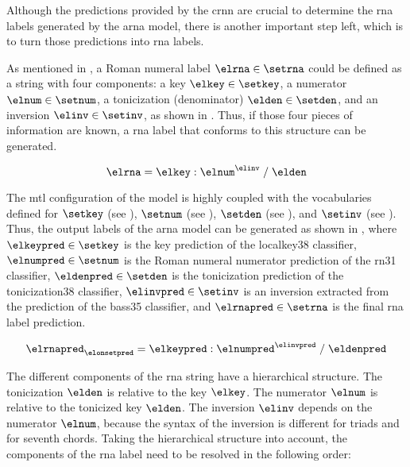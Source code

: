 
Although the predictions provided by the \gls{crnn} are
crucial to determine the \gls{rna} labels generated by the
\gls{arna} model, there is another important step left,
which is to turn those predictions into \gls{rna} labels.

As mentioned in
, a Roman
numeral label $\elrna \in \setrna$ could be defined as a
string with four components: a key $\elkey \in \setkey$, a
numerator $\elnum \in \setnum$, a tonicization (denominator)
$\elden \in \setden$, and an inversion $\elinv \in \setinv$,
as shown in . Thus, if those four pieces of
information are known, a \gls{rna} label that conforms to
this structure can be generated.

\begin{equation}
    \label{eq:rna}
    \elrna = \elkey : \elnum^{\elinv} \; / \; \elden
\end{equation}


The \gls{mtl} configuration of the model is highly coupled
with the vocabularies defined for $\setkey$ (see
), $\setnum$ (see
), $\setden$
(see ), and
$\setinv$ (see
). Thus, the
output labels of the \gls{arna} model can be generated as
shown in , where $\elkeypred \in \setkey$ is
the key prediction of the \gls{localkey38} classifier,
$\elnumpred \in \setnum$ is the Roman numeral numerator
prediction of the \gls{rn31} classifier, $\eldenpred \in
\setden$ is the tonicization prediction of the
\gls{tonicization38} classifier, $\elinvpred \in \setinv$ is
an inversion extracted from the prediction of the
\gls{bass35} classifier, and $\elrnapred \in \setrna$ is the
final \gls{rna} label prediction.

\begin{equation}
    \label{eq:rna_pred}
    \elrnapred_{\elonsetpred} = \elkeypred : \elnumpred^{\elinvpred} \; / \; \eldenpred
\end{equation}

The different components of the \gls{rna} string have a
hierarchical structure. The tonicization $\elden$ is
relative to the key $\elkey$. The numerator $\elnum$ is
relative to the tonicized key $\elden$. The inversion
$\elinv$ depends on the numerator $\elnum$, because the
syntax of the inversion is different for triads and for
seventh chords. Taking the hierarchical structure into
account, the components of the \gls{rna} label need to be
resolved in the following order:

